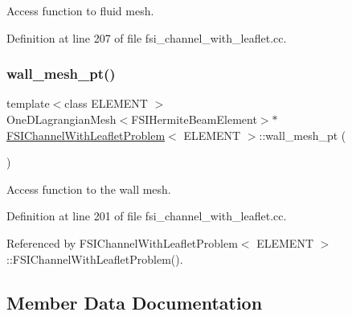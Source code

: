 Access function to fluid mesh. 



Definition at line 207 of file fsi\+\_\+channel\+\_\+with\+\_\+leaflet.\+cc.

\mbox{\label{classFSIChannelWithLeafletProblem_ab6a1c532882a71ddd576c752da389de0}} 
\subsubsection{\texorpdfstring{wall\+\_\+mesh\+\_\+pt()}{wall\_mesh\_pt()}}
{\footnotesize\ttfamily template$<$class E\+L\+E\+M\+E\+NT $>$ \\
One\+D\+Lagrangian\+Mesh$<$F\+S\+I\+Hermite\+Beam\+Element$>$$\ast$ \hyperlink{classFSIChannelWithLeafletProblem}{F\+S\+I\+Channel\+With\+Leaflet\+Problem}$<$ E\+L\+E\+M\+E\+NT $>$\+::wall\+\_\+mesh\+\_\+pt (\begin{DoxyParamCaption}{ }\end{DoxyParamCaption})\hspace{0.3cm}{\ttfamily [inline]}}



Access function to the wall mesh. 



Definition at line 201 of file fsi\+\_\+channel\+\_\+with\+\_\+leaflet.\+cc.



Referenced by F\+S\+I\+Channel\+With\+Leaflet\+Problem$<$ E\+L\+E\+M\+E\+N\+T $>$\+::\+F\+S\+I\+Channel\+With\+Leaflet\+Problem().



\subsection{Member Data Documentation}
\mbox{\label{classFSIChannelWithLeafletProblem_a40cee3652918bdcf67569afc89d3074d}} 
